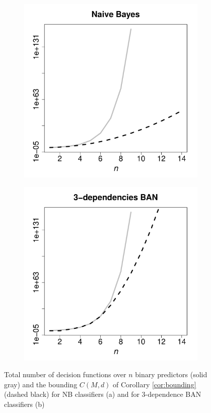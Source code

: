 \documentclass[11pt,a4paper, twoside]{book}
\begin{document}
\begin{figure}
\centering
\begin{subfigure}{0.45\textwidth}
\centering
\includegraphics[scale=0.35]{NBvsTOTAL}
\caption{}
\label{fig:graph1}
\end{subfigure}
\centering
\begin{subfigure}{0.45\textwidth}
\centering
\includegraphics[scale=0.35]{BAN3vsTOTAL}
\caption{}
\label{fig:graph2}
\end{subfigure}
\caption{Total number of decision functions over $n$ binary predictors (solid gray) and the bounding $C(M,d)$ of Corollary \ref{cor:bounding} (dashed black) for NB classifiers (a) and for 3-dependence BAN classifiers (b)}
\label{fig:graph}
\end{figure}
\end{document}
